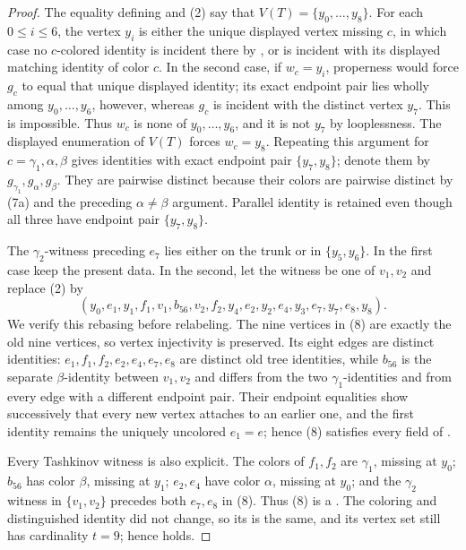 \begin{proof}
The equality defining  and (2) say that
$V(T)=\{y_0,\ldots,y_8\}$.  For each $0\le i\le6$, the vertex $y_i$ is
either the unique displayed vertex missing $c$, in which case no
$c$-colored identity is incident there by , or is
incident with its displayed matching identity of color $c$.  In the second
case, if $w_c=y_i$, properness would force $g_c$ to equal that unique
displayed identity; its exact endpoint pair lies wholly among
$y_0,\ldots,y_6$, however, whereas $g_c$ is incident with the distinct
vertex $y_7$.  This is impossible.  Thus $w_c$ is none of
$y_0,\ldots,y_6$, and it is not $y_7$ by looplessness.  The displayed
enumeration of $V(T)$ forces $w_c=y_8$.  Repeating this argument for
$c=\gamma_1,\alpha,\beta$ gives identities with exact endpoint pair
$\{y_7,y_8\}$; denote them by
$g_{\gamma_1},g_\alpha,g_\beta$.  They are pairwise distinct because
their colors are pairwise distinct by (7a) and the preceding
$\alpha\ne\beta$ argument.  Parallel identity is retained even though all
three have endpoint pair $\{y_7,y_8\}$.

The $\gamma_2$-witness preceding $e_7$ lies either on the trunk or in
$\{y_5,y_6\}$.  In the first case keep the present data.  In the second,
let the witness be one of $v_1,v_2$ and replace (2) by
\[
 (y_0,e_1,y_1,f_1,v_1,b_{56},v_2,f_2,y_4,
      e_2,y_2,e_4,y_3,e_7,y_7,e_8,y_8).             \tag{8}
\]
We verify this rebasing before relabeling.  The nine vertices in (8) are
exactly the old nine vertices, so vertex injectivity is preserved.  Its
eight edges are distinct identities: $e_1,f_1,f_2,e_2,e_4,e_7,e_8$ are
distinct old tree identities, while $b_{56}$ is the separate
$\beta$-identity between $v_1,v_2$ and differs from the two
$\gamma_1$-identities and from every edge with a different endpoint
pair.  Their endpoint equalities show successively that every new vertex
attaches to an earlier one, and the first identity remains the uniquely
uncolored $e_1=e$; hence (8) satisfies every field of
.

Every Tashkinov witness is also explicit.  The colors of $f_1,f_2$ are
$\gamma_1$, missing at $y_0$; $b_{56}$ has color $\beta$, missing at
$y_1$; $e_2,e_4$ have color $\alpha$, missing at $y_0$; and the
$\gamma_2$ witness in $\{v_1,v_2\}$ precedes both $e_7,e_8$ in (8).
Thus (8) is a .  The coloring and distinguished
identity did not change, so its  is the same, and its
vertex set still has cardinality $t=9$; hence
 holds.


\end{proof}

